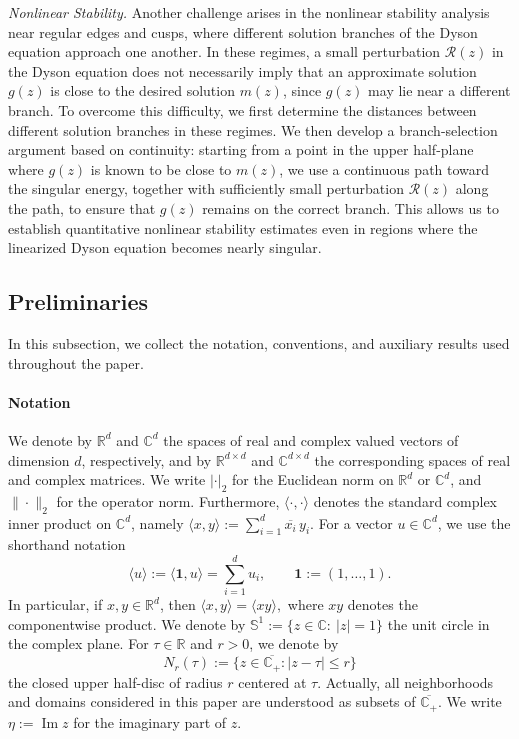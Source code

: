 \documentclass[11pt,twoside, a4paper]{article}
\numberwithin{equation}{section}
\numberwithin{figure}{section}
\theoremstyle{plain} %
\theoremstyle{definition}
\theoremstyle{remark}
\newcommand{\1} {\mspace{1 mu}}
\newcommand{\2} {\mspace{2 mu}}
\newcommand{\R} {\mathbb{R}}
\newcommand{\C} {{\mathbb{C}}}
\DeclareMathOperator{\im}{Im}
\begin{document}
\textit{Nonlinear Stability.}
Another challenge arises in the nonlinear stability analysis near regular edges and cusps, where different solution branches of the Dyson equation approach one another.
In these regimes, a small perturbation $\mathcal{R}(z)$ in the Dyson equation does not necessarily imply that an approximate solution $g(z)$ is close to the desired solution $m(z)$, since $g(z)$ may lie near a different branch. 
To overcome this difficulty, we first determine the distances between different solution branches in these regimes. We then develop a branch-selection argument based on continuity: starting from a point in the upper half-plane where $g(z)$ is known to be close to $m(z)$, we use a continuous path toward the singular energy, together with sufficiently small perturbation $\mathcal{R}(z)$ along the path, to ensure that $g(z)$ remains on the correct branch. 
This allows us to establish quantitative nonlinear stability estimates even in regions where the linearized Dyson equation becomes nearly singular.




\subsection{Preliminaries}\label{sec.preliminary}
In this subsection, we collect the notation, conventions, and auxiliary results used throughout the paper.

\paragraph{Notation} We denote by $\R^d$ and $\C^d$ the spaces of real and complex valued vectors of dimension $d$, respectively, and by $\R^{d\times d}$ and $\C^{d\times d}$ the corresponding spaces of real and complex matrices. 
We write $|\cdot|_2$ for the Euclidean norm on $\R^d$ or $\C^d$, and $\|\cdot\|_2$ for the operator norm. 
Furthermore, $\langle\cdot,\cdot\rangle$ denotes the standard complex inner product on $\mathbb C^d$, namely
$
\langle x,y\rangle:=\sum_{i=1}^d \overline{x_i}\,y_i .
$
For a vector $u\in\mathbb C^d$, we use the shorthand notation
\[
\langle u\rangle:=\langle \mathbf 1,u\rangle=\sum_{i=1}^d u_i,
\qquad \mathbf 1:=(1,\dots,1).
\]
In particular, if $x,y\in\mathbb R^d$, then
$
\langle x,y\rangle=\langle xy\rangle,
$
where $xy$ denotes the componentwise product.
We denote by
$
    \mathbb S^1:=\{z\in\mathbb C:\ |z|=1\}
$
the unit circle in the complex plane.
For \(\tau\in\mathbb R\) and \(r>0\), we denote by
\[
    N_r(\tau):=\{z\in\overline{\mathbb C_+}: |z-\tau|\le r\}
\]
the closed upper half-disc of radius \(r\) centered at \(\tau\). 
Actually, all neighborhoods and domains considered in this paper are understood as subsets of \(\overline{\mathbb C_+}\).
We write \(\eta:=\im z\) for the imaginary part of \(z\).
\end{document}
